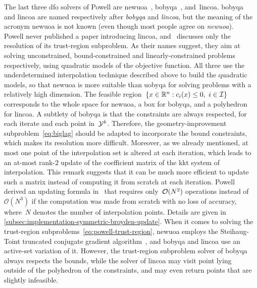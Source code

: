 The last three \gls{dfo} solvers of Powell are \gls{newuoa}~\cite{Powell_2006, Powell_2008}, \gls{bobyqa}~\cite{Powell_2009}, and~\gls{lincoa}.
\Gls{bobyqa} and \gls{lincoa} are named respectively after \emph{\glsdesc{bobyqa}} and \emph{\glsdesc{lincoa}}, but the meaning of the acronym \gls{newuoa} is not known (even though most people agree on \emph{\glsdesc{newuoa}}).
Powell never published a paper introducing \gls{lincoa}, and~\cite{Powell_2015} discusses only the resolution of its trust-region subproblem.
As their names suggest, they aim at solving unconstrained, bound-constrained and linearly-constrained problems respectively, using quadratic models of the objective function.
All three use the underdetermined interpolation technique described above to build the quadratic models, so that \gls{newuoa} is more suitable than \gls{uobyqa} for solving problems with a relatively high dimension.
The feasible region~$\set{\iter \in \R^n : \con{i}(\iter) \le 0, ~ i \in \iub}$ corresponds to the whole space for \gls{newuoa}, a box for \gls{bobyqa}, and a polyhedron for \gls{lincoa}.
A subtlety of \gls{bobyqa} is that the constraints are always respected, for each iterate and each point in~$\xpt[k]$.
Therefore, the geometry-improvement subproblem~\cref{eq:biglag} should be adapted to incorporate the bound constraints, which makes its resolution more difficult.
Moreover, as we already mentioned, at most one point of the interpolation set is altered at each iteration, which leads to an at-most rank-$2$ update of the coefficient matrix of the \gls{kkt} system of interpolation.
This remark suggests that it can be much more efficient to update such a matrix instead of computing it from scratch at each iteration.
Powell derived an updating formula in~\cite{Powell_2004b} that requires only~$\operatorname{\mathcal{O}}(N^2)$ operations instead of~$\mathcal{O}(N^3)$ if the computation was made from scratch with no loss of accuracy, where~$N$ denotes the number of interpolation points.
Details are given in \cref{subsec:implementation-symmetric-broyden-update}.
When it comes to solving the trust-region subproblems~\cref{eq:powell-trust-region}, \gls{newuoa} employs the Steihaug-Toint truncated conjugate gradient algorithm~\cite{Steihaug_1983,Toint_1981}, and \gls{bobyqa} and \gls{lincoa} use an active-set variation of it.
However, the trust-region subproblem solver of \gls{bobyqa} always respects the bounds, while the solver of \gls{lincoa} may visit point lying outside of the polyhedron of the constraints, and may even return points that are slightly infeasible.

